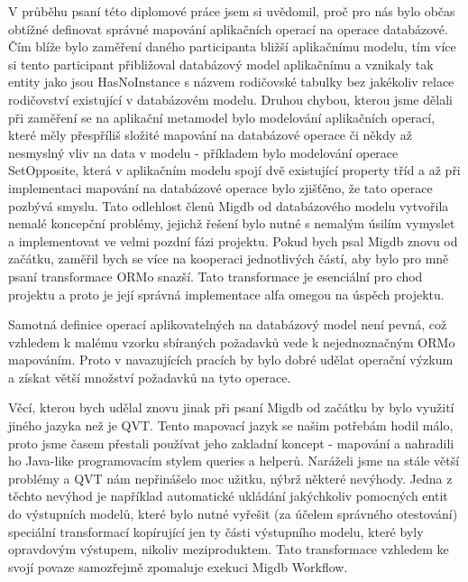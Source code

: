 \documentclass[11pt,twoside,a4paper]{book}
\begin{document}
V průběhu psaní této diplomové práce jsem si uvědomil, proč pro nás bylo občas
obtížné definovat správné mapování aplikačních operací na operace databázové.
Čím blíže bylo zaměření daného participanta bližší aplikačnímu modelu, tím více
si tento participant přibližoval databázový model aplikačnímu a vznikaly tak
entity jako jsou HasNoInstance s názvem rodičovské tabulky bez jakékoliv relace
rodičovství existující v databázovém modelu. Druhou chybou, kterou jsme
dělali při zaměření se na aplikační metamodel bylo modelování aplikačních
operací, které měly přespříliš složité mapování na databázové operace či někdy
až nesmyslný vliv na data v modelu - příkladem bylo modelování operace
SetOpposite, která v aplikačním modelu spojí dvě existující property tříd a až
při implementaci mapování na databázové operace bylo zjišťěno, že tato operace
pozbývá smyslu. Tato odlehlost členů Migdb od databázového modelu vytvořila
nemalé koncepční problémy, jejichž řešení bylo nutné s nemalým úsilím vymyslet
a implementovat ve velmi pozdní fázi projektu. Pokud bych psal Migdb znovu od
začátku, zaměřil bych se více na kooperaci jednotlivých částí, aby bylo pro mně
psaní transformace ORMo snazší. Tato transformace je esenciální pro chod
projektu a proto je její správná implementace alfa omegou na úspěch projektu.

Samotná definice operací aplikovatelných na databázový model není pevná, což
vzhledem k malému vzorku sbíraných požadavků vede k nejednoznačným ORMo
mapováním. Proto v navazujících pracích by bylo dobré udělat operační výzkum a
získat větší množství požadavků na tyto operace.

Věcí, kterou bych udělal znovu jinak při psaní Migdb od začátku by bylo využití
jiného jazyka než je QVT. Tento mapovací jazyk se našim potřebám hodil málo,
proto jsme časem přestali používat jeho zakladní koncept - mapování a nahradili
ho Java-like programovacím stylem queries a helperů. Naráželi jsme na stále
větší problémy a QVT nám nepřinášelo moc užitku, nýbrž některé nevýhody. Jedna z
těchto nevýhod je například automatické ukládání jakýchkoliv pomocných entit do
výstupních modelů, které bylo nutné vyřešit (za účelem správného
otestování) speciální transformací kopírující jen ty části výstupního modelu,
které byly opravdovým výstupem, nikoliv meziproduktem. Tato transformace
vzhledem ke svojí povaze samozřejmě zpomaluje exekuci Migdb Workflow.
\end{document}
